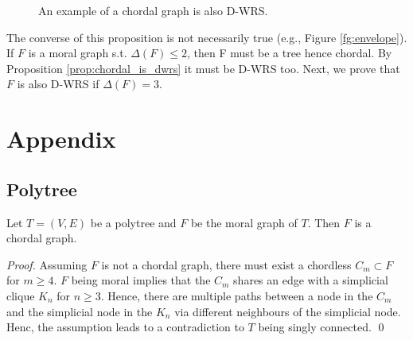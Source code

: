\begin{figure}[H]
\caption{An example of a chordal graph is also D-WRS.}
\label{fg:chordal_is_dwrs}
\end{figure}

The converse of this proposition is not necessarily true (e.g., Figure \ref{fg:envelope}). If $F$ is a moral graph s.t. $\Delta(F) \le 2$, then F must be a tree hence chordal. By Proposition \ref{prop:chordal_is_dwrs} it must be D-WRS too. Next, we prove that $F$ is also D-WRS if $\Delta(F)=3$.
\fi


\section{Appendix}
\subsection{Polytree}
\begin{proposition}
\label{prop:moral_of_pt_chordal}
Let $T=(V,E)$ be a polytree and $F$ be the moral graph of $T$. Then $F$ is a chordal graph. 
\end{proposition}
\begin{proof}
Assuming $F$ is not a chordal graph, there must exist a chordless $C_m \subset F$ for $m\ge 4$. $F$ being moral implies that the $C_m$ shares an edge with a simplicial clique $K_n$ for $n \ge 3$. Hence, there are multiple paths between a node in the $C_m$ and the simplicial node in the $K_n$ via different neighbours of the simplicial node. Henc, the assumption leads to a contradiction to $T$ being singly connected. \qed
\end{proof}

